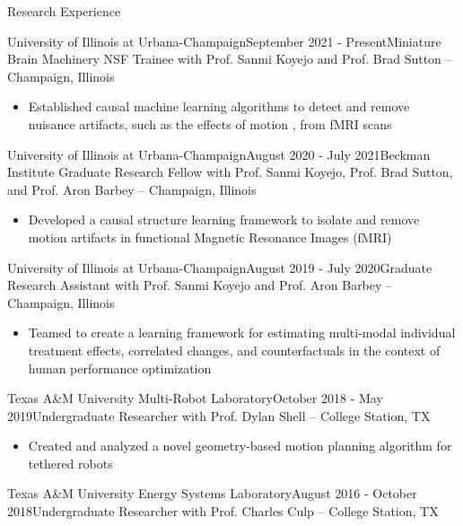 \documentclass[11pt]{resume} %
\begin{document}
\begin{rSection}{Research Experience}
\begin{rSubsection}{University of Illinois at Urbana-Champaign}{September 2021 - Present}{Miniature Brain Machinery NSF Trainee with Prof. Sanmi Koyejo and Prof. Brad Sutton -- Champaign, Illinois} 

\begin{itemize}[label={}]
    \setlength\itemsep{0em}
    \item Established causal machine learning algorithms to detect and remove nuisance artifacts, such as the effects of motion , from fMRI scans
\end{itemize}
\end{rSubsection}
\begin{rSubsection}{University of Illinois at Urbana-Champaign}{August 2020 - July 2021}{Beckman Institute Graduate Research Fellow with Prof. Sanmi Koyejo, Prof. Brad Sutton, and Prof. Aron Barbey -- Champaign, Illinois} 

\begin{itemize}[label={}]
    \setlength\itemsep{0em}
    \item Developed a causal structure learning framework to isolate and remove motion artifacts in functional Magnetic Resonance Images (fMRI)
\end{itemize}
\end{rSubsection}
\begin{rSubsection}{University of Illinois at Urbana-Champaign}{August 2019 - July 2020}{Graduate Research Assistant with Prof. Sanmi Koyejo and Prof. Aron Barbey -- Champaign, Illinois} 

\begin{itemize}[label={}]
    \setlength\itemsep{0em}
    \item Teamed to create a learning framework for estimating multi-modal individual treatment effects, correlated changes, and counterfactuals in the context of human performance optimization
\end{itemize}
\end{rSubsection}
\begin{rSubsection}{Texas A\&M University Multi-Robot Laboratory}{October 2018 - May 2019}{Undergraduate Researcher with Prof. Dylan Shell -- College Station, TX}

\begin{itemize}[label={}]
    \setlength\itemsep{0em}
    \item Created and analyzed a novel geometry-based motion planning algorithm for tethered robots
\end{itemize}
\end{rSubsection}
\begin{rSubsection}{Texas A\&M University Energy Systems Laboratory}{August 2016 - October 2018}{Undergraduate Researcher with Prof. Charles Culp -- College Station, TX}


\end{rSubsection}
\end{rSection}
\end{document}
